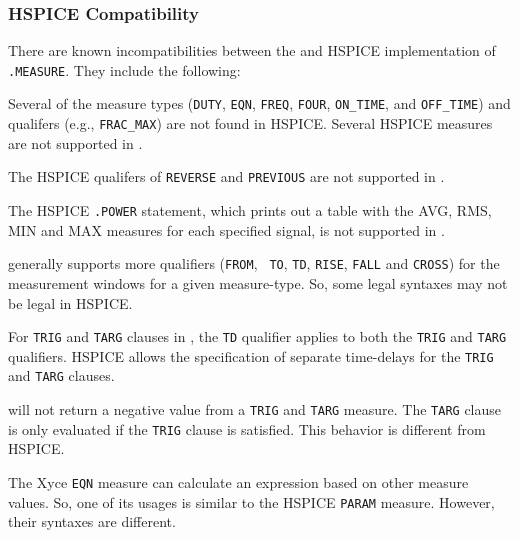 \subsubsection{HSPICE Compatibility}
\label{Measure_HSpice_Compatibility}
There are known incompatibilities between the \Xyce{} and HSPICE implementation
of {\tt .MEASURE}.  They include the following:

\begin{XyceItemize}

  \item Several of the \Xyce{} measure types ({\tt DUTY}, {\tt EQN},
         {\tt FREQ}, {\tt FOUR}, {\tt ON\_TIME}, and {\tt OFF\_TIME})
         and qualifers (e.g., {\tt FRAC\_MAX}) are not found in
         HSPICE.  Several HSPICE measures are not supported
         in \Xyce{}.

  \item The HSPICE qualifers of {\tt REVERSE} and {\tt PREVIOUS} are
  not supported in \Xyce{}.

  \item The HSPICE {\tt .POWER} statement, which prints out a table
        with the AVG, RMS, MIN and MAX measures for each specified
        signal, is not supported in \Xyce{}.

  \item \Xyce{} generally supports more qualifiers ({\tt FROM}, {\tt
        TO}, {\tt TD}, {\tt RISE}, {\tt FALL} and {\tt CROSS}) for the
        measurement windows for a given measure-type.  So, some
        legal \Xyce{} syntaxes may not be legal in HSPICE.

  \item For {\tt TRIG} and {\tt TARG} clauses in \Xyce{}, the {\tt TD}
        qualifier applies to both the {\tt TRIG} and {\tt TARG}
        qualifiers.  HSPICE allows the specification of separate
        time-delays for the {\tt TRIG} and {\tt TARG} clauses.

  \item \Xyce{} will not return a negative value from a {\tt TRIG} and
        {\tt TARG} measure.  The {\tt TARG} clause is only evaluated
        if the {\tt TRIG} clause is satisfied.  This behavior is
        different from HSPICE.

  \item The Xyce {\tt EQN} measure can calculate an expression based
        on other measure values.  So, one of its usages is similar to
        the HSPICE {\tt PARAM} measure.  However, their syntaxes are
        different.


\end{XyceItemize}
